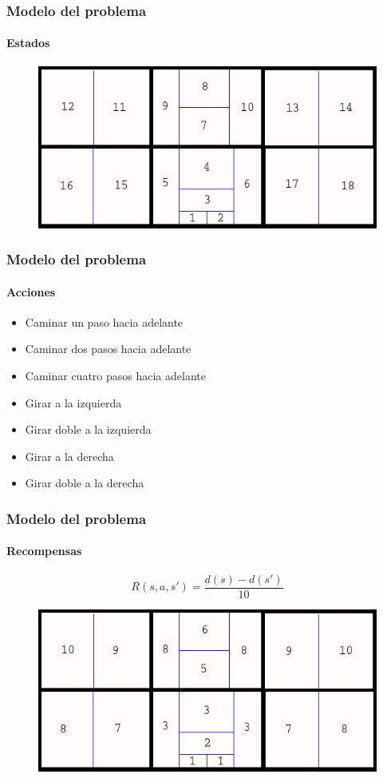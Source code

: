 \documentclass{beamer}
\begin{document}
\begin{frame}
\frametitle{Modelo del problema}
\framesubtitle{Estados}
\begin{figure}[hbtp]
\centering
\includegraphics[scale=0.5]{Regiones2.jpg} 
\end{figure}
\end{frame}

\begin{frame}
\frametitle{Modelo del problema}
\framesubtitle{Acciones}

\begin{itemize}
 \item Caminar un paso hacia adelante
 \item Caminar dos pasos hacia adelante
 \item Caminar cuatro pasos hacia adelante
 \item Girar a la izquierda
 \item Girar doble a la izquierda
 \item Girar a la derecha
 \item Girar doble a la derecha
\end{itemize}

\end{frame}


\begin{frame}
\frametitle{Modelo del problema}
\framesubtitle{Recompensas}

\begin{equation}
R(s,a,s') = \dfrac{d(s) - d(s')}{10}
\end{equation}

\begin{figure}[hbtp]
\centering
\includegraphics[scale=0.5]{Distancias2.jpg} 
\end{figure}

\end{frame}
\end{document}
